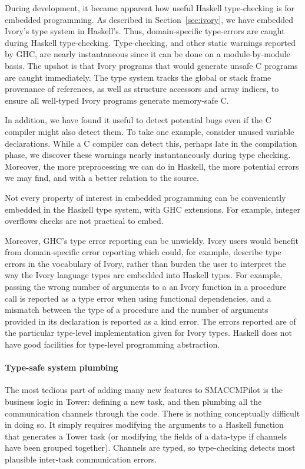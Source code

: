 During development, it became apparent how useful Haskell type-checking
is for embedded programming.  As described in Section~\ref{sec:ivory}, we
have embedded Ivory's type system in Haskell's.  Thus, domain-specific
type-errors are caught during Haskell type-checking.  Type-checking, and other
static warnings reported by GHC, are nearly instantaneous
since it can be done on a module-by-module basis.  The upshot is that Ivory
programs that would generate unsafe C programs are caught immediately.
The type system tracks the global or stack frame provenance of
references, as well as structure accessors and array indices, to ensure
all well-typed Ivory programs generate memory-safe C.

In addition, we have found it useful to detect potential bugs even if the C
compiler might also detect them.  To take one example, consider unused variable
declarations.  While a C compiler can detect this, perhaps late in the
compilation phase, we discover these warnings nearly instantaneously during type
checking.  Moreover, the more preprocessing we can do in Haskell, the more
potential errors we may find, and with a better relation to the source.

Not every property of interest in embedded programming can be conveniently
embedded in the Haskell type system, with GHC extensions.  For example, integer
overflows checks are not practical to embed.

Moreover, GHC's type error reporting can be unwieldy. Ivory users would benefit
from domain-specific error reporting which could, for example, describe type
errors in the vocabulary of Ivory, rather than burden the user to interpret the
way the Ivory language types are embedded into Haskell types.  For example,
passing the wrong number of arguments to a an Ivory function in a procedure call
is reported as a type error when using functional dependencies, and a mismatch
between the type of a procedure and the number of arguments provided in its
declaration is reported as a kind error.  The errors reported are of the
particular type-level implementation given for Ivory types.  Haskell does not
have good facilities for type-level programming abstraction.

\paragraph{Type-safe system plumbing}
The most tedious part of adding many new features to SMACCMPilot is the business
logic in Tower: defining a new task, and then plumbing all the communication
channels through the code.  There is nothing conceptually difficult in doing so.
It simply requires modifying the arguments to a Haskell function that generates
a Tower task (or modifying the fields of a data-type if channels have been
grouped together).  Channels are typed, so type-checking detects most plausible
inter-task communication errors.

